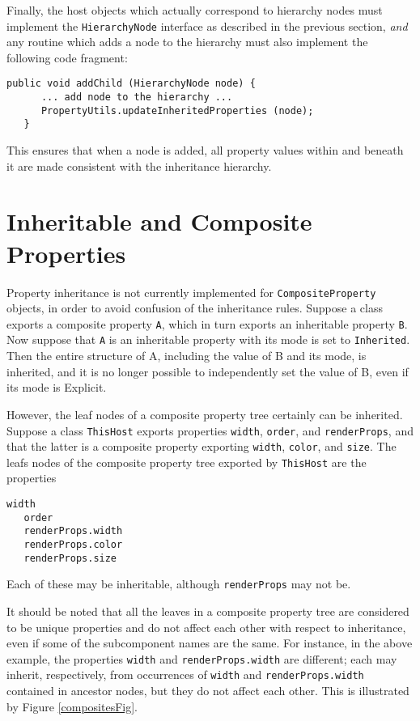 Finally, the host objects which actually correspond to hierarchy nodes
must implement the {\tt HierarchyNode} interface as described in the
previous section, {\it and} any routine which adds a node to the
hierarchy must also implement the following code fragment:
\begin{lstlisting}[]
   public void addChild (HierarchyNode node) {
      ... add node to the hierarchy ...
      PropertyUtils.updateInheritedProperties (node);
   }      
\end{lstlisting}
This ensures that when a node is added, all property values within and
beneath it are made consistent with the inheritance hierarchy.

\section{Inheritable and Composite Properties}

Property inheritance is not currently implemented for 
{\tt CompositeProperty} objects, in order to avoid confusion of the
inheritance rules. Suppose a class exports a composite property 
{\tt A}, which in turn exports an inheritable property {\tt B}.  Now
suppose that {\tt A} is an inheritable property with its mode is set
to {\tt Inherited}. Then the entire structure of A, including the
value of B and its mode, is inherited, and it is no longer possible to
independently set the value of B, even if its mode is Explicit.

However, the leaf nodes of a composite property tree certainly can be
inherited. Suppose a class {\tt ThisHost} exports properties 
{\tt width}, {\tt order}, and {\tt renderProps}, and that the latter is a
composite property exporting {\tt width}, {\tt color}, and {\tt size}.
The leafs nodes of the composite property tree exported
by {\tt ThisHost} are the properties
\begin{lstlisting}[]
   width
   order
   renderProps.width
   renderProps.color
   renderProps.size
\end{lstlisting}
Each of these may be inheritable, although {\tt renderProps} may not be. 

It should be noted that all the leaves in a composite property tree
are considered to be unique properties and do not affect each other
with respect to inheritance, even if some of the subcomponent names
are the same. For instance, in the above example, the properties 
{\tt width} and {\tt renderProps.width} are different; each may inherit,
respectively, from occurrences of {\tt width} and 
{\tt renderProps.width} contained in ancestor nodes, but they do not affect
each other. This is illustrated by Figure \ref{compositesFig}.

